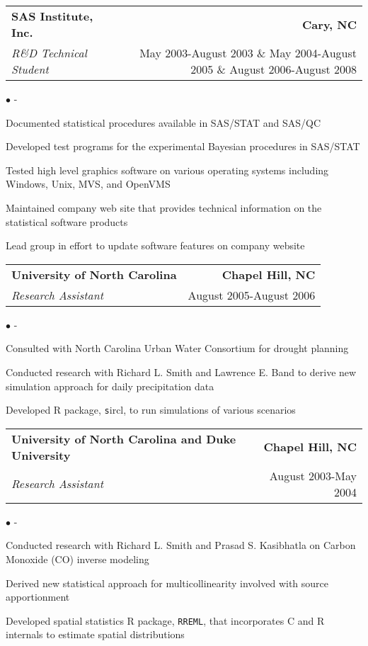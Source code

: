 \documentclass[letterpaper,10pt]{article}
\begin{document}
\begin{tabular*}{7.5in}{l@{\extracolsep{\fill}}r} \textbf{SAS
    Institute, Inc.} & \textbf{Cary, NC} \\ \emph{R\&D Technical Student} &
  May 2003-August 2003 \& May 2004-August 2005 \& August 2006-August 2008\\
\end{tabular*}
\begin{list}{$\bullet$}{\itemsep -5pt \topsep -\parskip}
\item Documented statistical procedures available in SAS/STAT and
  SAS/QC 
\item Developed test programs for the experimental Bayesian procedures
  in SAS/STAT
\item Tested high level graphics software on various operating systems
  including Windows, Unix, MVS, and OpenVMS
\item Maintained company web site that provides technical information
  on the statistical software products
\item Lead group in effort to update software features on company
  website
\end{list}
	
\begin{tabular*}{7.5in}{l@{\extracolsep{\fill}}r}
\textbf{University of North Carolina} & \textbf{Chapel Hill, NC} \\
\emph{Research Assistant} & August 2005-August 2006 \\
\end{tabular*}
\begin{list}{$\bullet$}{\itemsep -5pt \topsep -\parskip}
\item Consulted with North Carolina Urban Water Consortium for
  drought planning
\item Conducted research with Richard L. Smith and Lawrence E. Band to
  derive new simulation approach for daily precipitation data
\item Developed R package, {\texttt sircl}, to run simulations of
  various scenarios
\end{list}
	
\begin{tabular*}{7.5in}{l@{\extracolsep{\fill}}r}
\textbf{University of North Carolina and Duke University} &
\textbf{Chapel Hill, NC} \\ \emph{Research Assistant} & August 2003-May 2004 \\
\end{tabular*}
\begin{list}{$\bullet$}{\itemsep -5pt \topsep -\parskip}
\item Conducted research with Richard L. Smith and Prasad S. Kasibhatla
  on Carbon Monoxide (CO) inverse modeling
\item Derived new statistical approach for multicollinearity involved
  with source apportionment
\item Developed spatial statistics R package, \texttt{RREML}, that
  incorporates C and R internals to estimate spatial distributions
\end{list}
	
\end{document}
